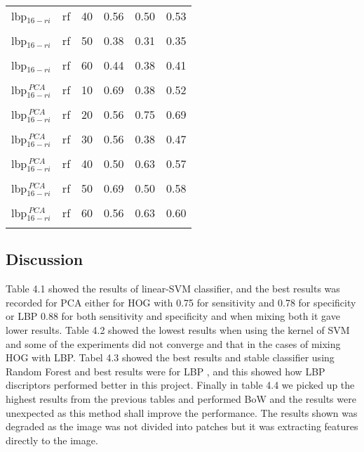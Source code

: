 \begin{table}
{\begin{tabular}{l c c  lcr}
 \acs{lbp}$_{16-ri}$ & \acs{rf} & 40 & 0.56 & 0.50 & 0.53 \\
 \multicolumn{6}{c}{}\\[-1.5ex]

 \acs{lbp}$_{16-ri}$ & \acs{rf} & 50 & 0.38 & 0.31 & 0.35 \\
 \multicolumn{6}{c}{}\\[-1.5ex]


 \acs{lbp}$_{16-ri}$ & \acs{rf} & 60 & 0.44 & 0.38 & 0.41 \\
 \multicolumn{6}{c}{}\\[-1.5ex]

\acs{lbp}$_{16-ri}^{~PCA}$ & \acs{rf} & 10 & 0.69 & 0.38 & 0.52  \\
 \multicolumn{5}{c}{}\\[-2ex]

\acs{lbp}$_{16-ri}^{~PCA}$ & \acs{rf} & 20 & 0.56 & 0.75 & 0.69  \\
 \multicolumn{5}{c}{}\\[-2ex]

\acs{lbp}$_{16-ri}^{~PCA}$ & \acs{rf} & 30 & 0.56 & 0.38 & 0.47  \\
 \multicolumn{5}{c}{}\\[-2ex]

\acs{lbp}$_{16-ri}^{~PCA}$ & \acs{rf} & 40 & 0.50 & 0.63 & 0.57  \\
 \multicolumn{5}{c}{}\\[-2ex]
 
 \acs{lbp}$_{16-ri}^{~PCA}$ & \acs{rf} & 50 & 0.69 & 0.50 & 0.58  \\
 \multicolumn{5}{c}{}\\[-2ex]

 \acs{lbp}$_{16-ri}^{~PCA}$ & \acs{rf} & 60 & 0.56 & 0.63 & 0.60  \\
 \multicolumn{5}{c}{}\\[-2ex]

\bottomrule
\end{tabular}
}
\label{tab:tab3}
\end{table}

\subsection{Discussion}
Table 4.1 showed the results of linear-SVM classifier, and the best results was recorded for PCA either for HOG with 0.75 for sensitivity and 0.78 for specificity or LBP 0.88 for both sensitivity and specificity and when mixing both it gave lower results. 
Table 4.2 showed the lowest results when using the kernel of SVM and some of the experiments did not converge and that in the cases of mixing HOG with LBP.
Tabel 4.3 showed the best results and stable classifier using Random Forest and best results were for LBP , and this showed how LBP discriptors performed better in this project.
Finally in table 4.4 we picked up the highest results from the previous tables and performed BoW and the results were unexpected as this method shall improve the performance.
The results shown was degraded as the image was not divided into patches but it was extracting features directly to the image.

